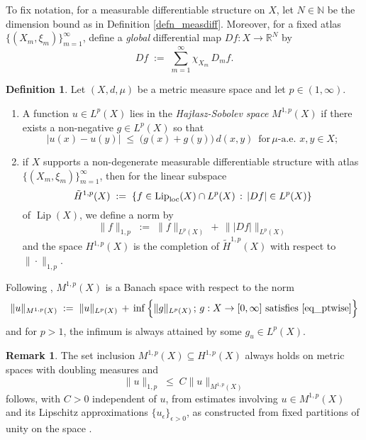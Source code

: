 \documentclass[reqno]{amsart}
\theoremstyle{plain}
\theoremstyle{definition}
\newtheorem{defn}[thm]{Definition}
\newtheorem{rmk}[thm]{Remark}
\theoremstyle{remark}
\numberwithin{equation}{section}
\newcommand{\e}{\epsilon}
\newcommand{\Lip}{\operatorname{Lip}}
\newcommand{\N}{\mathbb{N}}
\newcommand{\R}{\mathbb{R}}
\begin{document}
To fix notation, for a measurable differentiable structure on $X$, let $N \in \N$ be the dimension bound as in Definition \ref{defn_measdiff}.  Moreover, for a fixed atlas $\{(X_m,\xi_m)\}_{m=1}^\infty$, define a {\em global} differential map $Df : X \to \R^N$ by
$$
Df \;:=\; \sum_{m=1}^\infty \chi_{X_m} \, D_mf.
$$

\begin{defn} \label{defn_metricsobolev}
Let $(X,d,\mu)$ be a metric measure space and let $p \in (1,\infty)$.
\begin{enumerate}
\item A function $u \in L^p(X)$ lies in the {\em Haj{\l}asz-Sobolev space} $M^{1,p}(X)$ if there exists a non-negative $g \in L^p(X)$ so that
\begin{equation} \label{eq_ptwise}
|u(x) - u(y)| \;\leq\; \big( g(x) + g(y) \big) \, d(x,y) 
\, \text{ for} \, \mu\textrm{-a.e.\ } x,y \in X;
\end{equation}
\item if $X$ supports a non-degenerate measurable differentiable structure with atlas $\{(X_m,\xi_m)\}_{m=1}^\infty$, then for the linear subspace
$$
\tilde{H}^{1,p}(X) \;:=\; \{ f \in \Lip_{\rm loc}(X) \cap L^p(X) \,:\, |Df| \in L^p(X) \}
$$
of $\Lip(X)$, we define a norm by
$$
\|f\|_{1,p} \;:=\; \|f\|_{L^p(X)} \,+\, \| |Df| \|_{L^p(X)}
$$
and the space $H^{1,p}(X)$ is the completion of $\tilde{H}^{1,p}(X)$ with respect to $\|\cdot\|_{1,p}$.
\end{enumerate}
\end{defn}

Following \cite{Hajlasz}, $M^{1,p}(X)$ is a Banach space with respect to the norm
$$
\|u\|_{M^{1,p}(X)} \;:=\; 
\|u\|_{L^p(X)} \,+\, 
\inf\Big\{ \|g\|_{L^p(X)} \,;\, g : X \to [0,\infty] \text{ satisfies } \eqref{eq_ptwise} \Big\}
$$
and for $p > 1$, the infimum is always attained by some $g_u \in L^p(X)$.

\begin{rmk}
The set inclusion 
$M^{1,p}(X) \subseteq H^{1,p}(X)$
always holds on metric spaces with doubling measures \cite[Thm 9]{Franchi:Hajlasz:Koskela} and 
\begin{equation} \label{eq_normbd}
\|u\|_{1,p} \;\leq\; C \|u\|_{M^{1,p}(X)}
\end{equation}
follows, with $C > 0$ independent of $u$, from estimates involving $u \in M^{1,p}(X)$ and its Lipschitz approximations $\{u_\e\}_{\e > 0}$, as constructed from fixed partitions of unity on the space \cite[Lem 12]{Franchi:Hajlasz:Koskela}.
\end{rmk}
\end{document}
